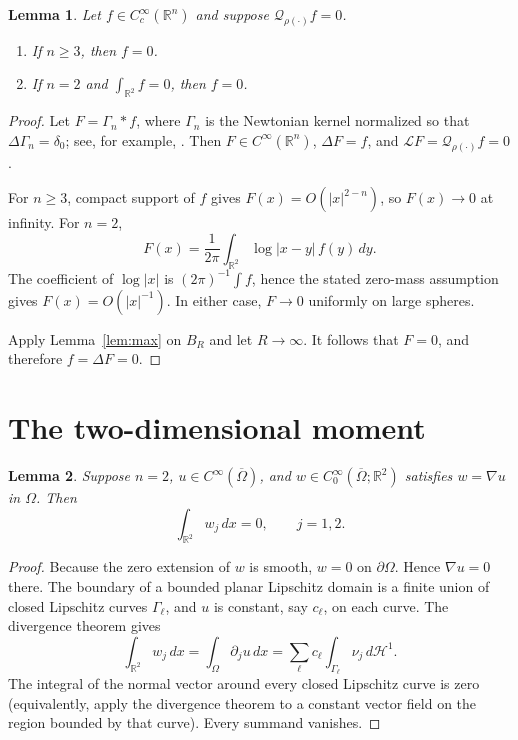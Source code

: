 \documentclass[11pt]{article}
\newtheorem{lemma}{Lemma}
\newcommand{\Qhet}{\mathcal Q_{\rho(\cdot)}}
\begin{document}
\begin{lemma}\label{lem:scalar}
Let \(f\in C_c^\infty(\mathbb R^n)\) and suppose \(\Qhet f=0\).
\begin{enumerate}
\item If \(n\geq3\), then \(f=0\).
\item If \(n=2\) and \(\int_{\mathbb R^2}f=0\), then \(f=0\).
\end{enumerate}
\end{lemma}

\begin{proof}
Let \(F=\Gamma_n*f\), where \(\Gamma_n\) is the Newtonian kernel normalized
so that \(\Delta\Gamma_n=\delta_0\); see, for example, \cite[Section~2.2]{Evans}.
Then \(F\in C^\infty(\mathbb R^n)\), \(\Delta F=f\), and
\(\mathcal LF=\Qhet f=0\).

For \(n\geq3\), compact support of \(f\) gives
\(F(x)=O(|x|^{2-n})\), so \(F(x)\to0\) at infinity. For \(n=2\),
\[
 F(x)=\frac1{2\pi}\int_{\mathbb R^2}\log|x-y|\,f(y)\,dy.
\]
The coefficient of \(\log|x|\) is \((2\pi)^{-1}\int f\), hence the stated
zero-mass assumption gives \(F(x)=O(|x|^{-1})\). In either case,
\(F\to0\) uniformly on large spheres.

Apply Lemma~\ref{lem:max} on \(B_R\) and let \(R\to\infty\). It follows that
\(F=0\), and therefore \(f=\Delta F=0\).
\end{proof}

\section*{The two-dimensional moment}

\begin{lemma}\label{lem:moment}
Suppose \(n=2\), \(u\in C^\infty(\overline\Omega)\), and
\(w\in C_0^\infty(\overline\Omega;\mathbb R^2)\) satisfies
\(w=\nabla u\) in \(\Omega\). Then
\[
 \int_{\mathbb R^2}w_j\,dx=0,\qquad j=1,2.
\]
\end{lemma}

\begin{proof}
Because the zero extension of \(w\) is smooth, \(w=0\) on
\(\partial\Omega\). Hence \(\nabla u=0\) there. The boundary of a bounded
planar Lipschitz domain is a finite union of closed Lipschitz curves
\(\Gamma_\ell\), and \(u\) is constant, say \(c_\ell\), on each curve.
The divergence theorem gives
\[
 \int_{\mathbb R^2}w_j\,dx
 =\int_\Omega\partial_j u\,dx
 =\sum_\ell c_\ell
   \int_{\Gamma_\ell}\nu_j\,d\mathcal H^1.
\]
The integral of the normal vector around every closed Lipschitz curve is
zero (equivalently, apply the divergence theorem to a constant vector field
on the region bounded by that curve). Every summand vanishes.
\end{proof}
\end{document}
